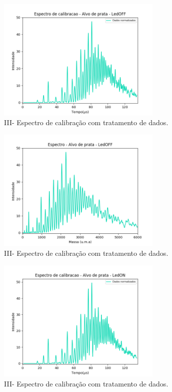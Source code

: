 \begin{figure}
  \centering  
  \includegraphics[width=0.7\textwidth]{exp_03/LEDOFF_normalizado_mcp.png}
  \caption{III- Espectro de calibração com tratamento de dados.}
  \label{fig:03_ledoff_dados_tratados} 
\end{figure}

\begin{figure}
  \centering  
  \includegraphics[width=0.7\textwidth]{exp_03/LEDOFF_espec_calib_ag_massa.png}
  \caption{III- Espectro de calibração com tratamento de dados.}
  \label{fig:03_ledoff_massa} 
\end{figure}



\begin{figure}
  \centering  
  \includegraphics[width=0.7\textwidth]{exp_03/LEDON_normalizado_mcp.png}
  \caption{III- Espectro de calibração com tratamento de dados.}
  \label{fig:03_ledon_dados_tratados} 
\end{figure}

